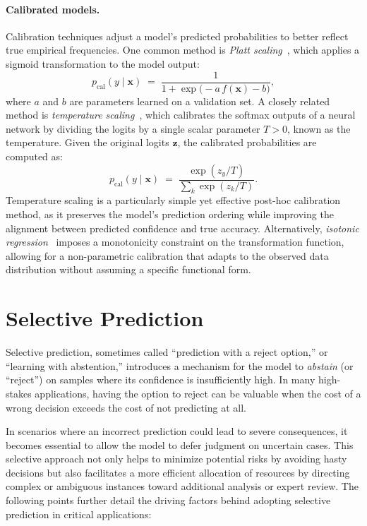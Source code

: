 \paragraph{Calibrated models.}
Calibration techniques adjust a model’s predicted probabilities to better reflect true empirical frequencies. One common method is \emph{Platt scaling}~\citep{platt1999probabilistic}, which applies a sigmoid transformation to the model output:
\begin{equation}
p_{\text{cal}}(y \mid \bm{x}) \;=\; \frac{1}{1 + \exp\bigl(-a \, f(\bm{x}) - b\bigr)},
\end{equation}
where $a$ and $b$ are parameters learned on a validation set. A closely related method is \emph{temperature scaling}~\citep{guo2017calibration}, which calibrates the softmax outputs of a neural network by dividing the logits by a single scalar parameter $T > 0$, known as the temperature. Given the original logits $\bm{z}$, the calibrated probabilities are computed as:
\begin{equation}
p_{\text{cal}}(y \mid \bm{x}) \;=\; \frac{\exp(z_y / T)}{\sum_{k} \exp(z_k / T)}.
\end{equation}
Temperature scaling is a particularly simple yet effective post-hoc calibration method, as it preserves the model’s prediction ordering while improving the alignment between predicted confidence and true accuracy. Alternatively, \emph{isotonic regression}~\citep{zadrozny2002transforming} imposes a monotonicity constraint on the transformation function, allowing for a non-parametric calibration that adapts to the observed data distribution without assuming a specific functional form.




\section{Selective Prediction}
Selective prediction, sometimes called ``prediction with a reject option,'' or ``learning with abstention,'' introduces a mechanism for the model to \emph{abstain} (or ``reject'') on samples where its confidence is insufficiently high. In many high-stakes applications, having the option to reject can be valuable when the cost of a wrong decision exceeds the cost of not predicting at all.

In scenarios where an incorrect prediction could lead to severe consequences, it becomes essential to allow the model to defer judgment on uncertain cases. This selective approach not only helps to minimize potential risks by avoiding hasty decisions but also facilitates a more efficient allocation of resources by directing complex or ambiguous instances toward additional analysis or expert review. The following points further detail the driving factors behind adopting selective prediction in critical applications:

